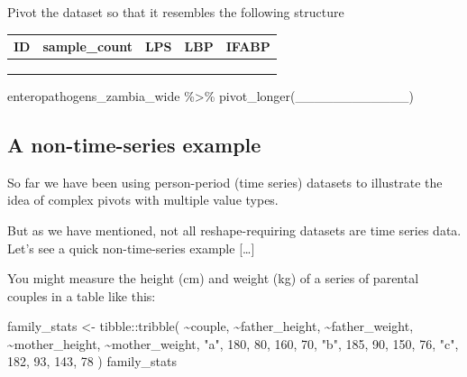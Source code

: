 \documentclass[
  letterpaper,
  DIV=11,
  numbers=noendperiod]{scrreprt}
\newenvironment{Shaded}{\begin{snugshade}}{\end{snugshade}}
\newcommand{\DecValTok}[1]{\textcolor[rgb]{0.68,0.00,0.00}{#1}}
\newcommand{\FunctionTok}[1]{\textcolor[rgb]{0.28,0.35,0.67}{#1}}
\newcommand{\NormalTok}[1]{\textcolor[rgb]{0.00,0.23,0.31}{#1}}
\newcommand{\OtherTok}[1]{\textcolor[rgb]{0.00,0.23,0.31}{#1}}
\newcommand{\SpecialCharTok}[1]{\textcolor[rgb]{0.37,0.37,0.37}{#1}}
\newcommand{\StringTok}[1]{\textcolor[rgb]{0.13,0.47,0.30}{#1}}
\begin{document}
\begin{tcolorbox}
Pivot the dataset so that it resembles the following structure

\begin{longtable}[]{@{}lllll@{}}
\toprule\noalign{}
ID & sample\_count & LPS & LBP & IFABP \\
\midrule\noalign{}
\endhead
\bottomrule\noalign{}
\endlastfoot
& & & & \\
& & & & \\
& & & & \\
\end{longtable}

\begin{Shaded}
\begin{Highlighting}[]
\NormalTok{enteropathogens\_zambia\_wide }\SpecialCharTok{\%\textgreater{}\%} 
   \FunctionTok{pivot\_longer}\NormalTok{(\_\_\_\_\_\_\_\_\_\_\_\_)}
\end{Highlighting}
\end{Shaded}

\end{tcolorbox}

\hypertarget{a-non-time-series-example}{%
\subsection{A non-time-series example}\label{a-non-time-series-example}}

So far we have been using person-period (time series) datasets to
illustrate the idea of complex pivots with multiple value types.

But as we have mentioned, not all reshape-requiring datasets are time
series data. Let's see a quick non-time-series example {[}\ldots{]}

You might measure the height (cm) and weight (kg) of a series of
parental couples in a table like this:

\begin{Shaded}
\begin{Highlighting}[]
\NormalTok{family\_stats }\OtherTok{\textless{}{-}} 
\NormalTok{  tibble}\SpecialCharTok{::}\FunctionTok{tribble}\NormalTok{(}
  \SpecialCharTok{\textasciitilde{}}\NormalTok{couple, }\SpecialCharTok{\textasciitilde{}}\NormalTok{father\_height, }\SpecialCharTok{\textasciitilde{}}\NormalTok{father\_weight, }\SpecialCharTok{\textasciitilde{}}\NormalTok{mother\_height, }\SpecialCharTok{\textasciitilde{}}\NormalTok{mother\_weight,}
      \StringTok{"a"}\NormalTok{,            }\DecValTok{180}\NormalTok{,            }\DecValTok{80}\NormalTok{,            }\DecValTok{160}\NormalTok{,             }\DecValTok{70}\NormalTok{,}
      \StringTok{"b"}\NormalTok{,            }\DecValTok{185}\NormalTok{,            }\DecValTok{90}\NormalTok{,            }\DecValTok{150}\NormalTok{,             }\DecValTok{76}\NormalTok{,}
      \StringTok{"c"}\NormalTok{,            }\DecValTok{182}\NormalTok{,            }\DecValTok{93}\NormalTok{,            }\DecValTok{143}\NormalTok{,             }\DecValTok{78}
\NormalTok{  )}
\NormalTok{family\_stats}
\end{Highlighting}
\end{Shaded}
\end{document}
